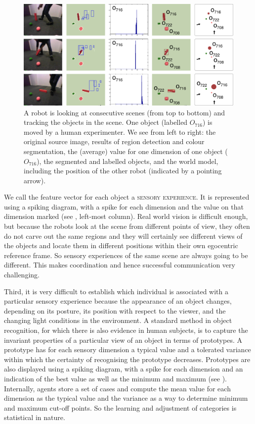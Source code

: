 \begin{figure}[htbp]
  \centerline{\includegraphics[width=.85\textwidth]{chap10/figs/png-perception.pdf}}
\caption{\label{fig:png-perception}A robot is looking at consecutive scenes (from top to bottom) and tracking the objects in the scene. One object (labelled $O_{716}$)
is moved by a human experimenter.  We see from left to right: the original source image, results of region detection and 
colour segmentation, the (average) value for one dimension of one object ($O_{716}$), the segmented and labelled objects, 
and the world model, including the position of the other robot (indicated by a pointing arrow). }
\end{figure}
\clearpage
We call the feature vector for each object a {\scshape sensory experience}. 
It is represented using a spiking 
diagram, with a spike for each dimension and the value on that dimension marked (see 
, left-most column). Real
world vision is difficult enough, but because the robots look at the
scene from different points of view, they often do not carve out the
same regions and they will certainly see different views of the
objects and locate them in different positions within their own
egocentric reference frame. So sensory experiences of the same scene
are always going to be different. This makes coordination and hence successful
communication very challenging. 

Third, it is very difficult to establish which individual is associated with a particular
sensory experience because the appearance of an object changes, depending on
its posture, its position with respect to the viewer, and the changing
light conditions in the environment. A standard method in object
recognition, for which there is also evidence in human subjects, is to
capture the invariant properties of a particular view of an object in
terms of prototypes. A prototype has for each sensory dimension a typical value and a tolerated variance
within which the certainty of recognising the prototype decreases. Prototypes are also displayed using a spiking 
diagram, with a spike for each dimension and an indication of the best value as well as the minimum and maximum
(see ). Internally, agents store a set of cases 
and compute the mean value for each dimension as the typical value and the variance as a way to determine 
minimum and maximum cut-off points. So the learning and adjustment of categories is statistical in nature. 

